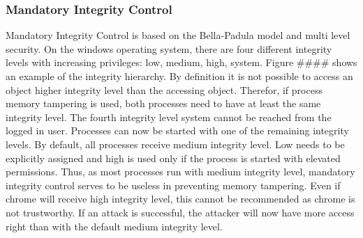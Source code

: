 \subsubsection{Mandatory Integrity Control}
Mandatory Integrity Control is based on the Bella-Padula model and multi level security. On the windows operating system, there are four different integrity levels with increasing privileges: low, medium, high, system. Figure \#\#\#\# shows an example of the integrity hierarchy. By definition it is not possible to access an object higher integrity level than the accessing object. Therefor, if process memory tampering is used, both processes need to have at least the same integrity level. The fourth integrity level system cannot be reached from the logged in user. Processes can now be started with one of the remaining integrity levels. By default, all processes receive medium integrity level. Low needs to be explicitly assigned and high is used only if the process is started with elevated permissions. Thus, as most processes run with medium integrity level, mandatory integrity control serves to be useless in preventing memory tampering. Even if chrome will receive high integrity level, this cannot be recommended as chrome is not trustworthy. If an attack is successful, the attacker will now have more access right than with the default medium integrity level.